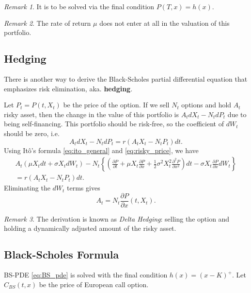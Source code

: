 \documentclass[a4paper,12pt]{article}
\numberwithin{equation}{section}
\theoremstyle{definition}
\theoremstyle{remark}
\newtheorem{remark}{Remark}[section]
\begin{document}
\begin{remark}
It is to be solved via the final condition $P(T,x)=h(x)$.
\end{remark}

\begin{remark}
The rate of return $\mu$ does not enter at all in the valuation 
of this portfolio.
\end{remark}

\subsection{Hedging}
There is another way to derive the Black-Scholes partial 
differential equation that emphasizes risk elimination, aka. 
\textbf{hedging}.

Let $P_{t}=P(t,X_{t})$ be the price of the option. If we sell $N_t$ 
options and hold $A_t$ risky asset, then the change in the value of 
this portfolio is $A_{t}dX_{t}-N_{t}dP_{t}$ due to being self-financing. 
This portfolio should be risk-free, so the coefficient of $dW_{t}$ 
should be zero, i.e. 
\begin{equation}
    A_{t}dX_{t}-N_{t}dP_{t}=r(A_{t}X_{t}-N_{t}P_{t})dt.
\end{equation}
Using It\^o's formula \eqref{eq:ito_general} and 
\eqref{eq:risky_price}, we have 
\begin{equation}
    \begin{split}
        A_{t}(\mu X_{t}dt+\sigma X_{t}dW_{t})-N_{t}\left\{\left(
        \frac{\partial P}{\partial t}
        +\mu X_{t}\frac{\partial P}{\partial x}
        +\frac{1}{2}\sigma^{2}X_{t}^{2}\frac{\partial^{2} P}{\partial {x}^{2}}
        \right)dt-\sigma X_{t}\frac{\partial P}{\partial x}dW_{t}\right\} \\
        =r(A_{t}X_{t}-N_{t}P_{t})dt.
    \end{split}
\end{equation}
Eliminating the $dW_{t}$ terms gives 
\begin{equation}
    A_{t}=N_{t}\frac{\partial P}{\partial x}(t,X_{t}).
\end{equation}

\begin{remark}
The derivation is known as \textit{Delta Hedging}: selling the 
option and holding a dynamically adjusted amount of the risky 
asset.
\end{remark}

\subsection{Black-Scholes Formula}
BS-PDE \eqref{eq:BS_pde} is solved with the final condition 
$h(x)=(x-K)^+$. Let $C_{BS}(t,x)$ be the price of European call option. 
\end{document}
